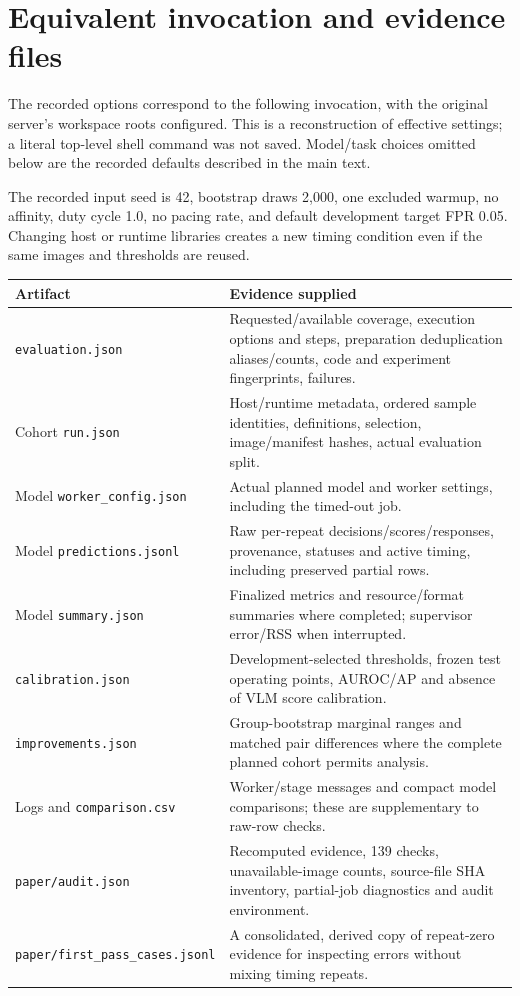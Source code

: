 \documentclass[11pt,a4paper]{article}
\newcommand{\code}[1]{\nolinkurl{#1}}
\begin{document}
\section{Equivalent invocation and evidence files}
The recorded options correspond to the following invocation, with the original server's workspace roots configured. This is a reconstruction of effective settings; a literal top-level shell command was not saved. Model/task choices omitted below are the recorded defaults described in the main text.

The recorded input seed is 42, bootstrap draws 2,000, one excluded warmup, no affinity, duty cycle 1.0, no pacing rate, and default development target FPR 0.05. Changing host or runtime libraries creates a new timing condition even if the same images and thresholds are reused.

\begin{longtable}{P{5.4cm}P{9.8cm}}\toprule Artifact & Evidence supplied\\\midrule\endhead
\code{evaluation.json} & Requested/available coverage, execution options and steps, preparation deduplication aliases/counts, code and experiment fingerprints, failures.\\
Cohort \code{run.json} & Host/runtime metadata, ordered sample identities, definitions, selection, image/manifest hashes, actual evaluation split.\\
Model \code{worker_config.json} & Actual planned model and worker settings, including the timed-out job.\\
Model \code{predictions.jsonl} & Raw per-repeat decisions/scores/responses, provenance, statuses and active timing, including preserved partial rows.\\
Model \code{summary.json} & Finalized metrics and resource/format summaries where completed; supervisor error/RSS when interrupted.\\
\code{calibration.json} & Development-selected thresholds, frozen test operating points, AUROC/AP and absence of VLM score calibration.\\
\code{improvements.json} & Group-bootstrap marginal ranges and matched pair differences where the complete planned cohort permits analysis.\\
Logs and \code{comparison.csv} & Worker/stage messages and compact model comparisons; these are supplementary to raw-row checks.\\
\code{paper/audit.json} & Recomputed evidence, 139 checks, unavailable-image counts, source-file SHA inventory, partial-job diagnostics and audit environment.\\
\code{paper/first_pass_cases.jsonl} & A consolidated, derived copy of repeat-zero evidence for inspecting errors without mixing timing repeats.\\
\bottomrule\end{longtable}
\end{document}
